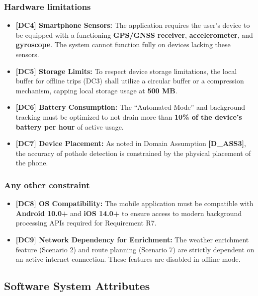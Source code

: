 \subsubsection{Hardware limitations}
\begin{itemize}
    \item \textbf{[DC4] Smartphone Sensors:} The application requires the user's device to be equipped with a functioning \textbf{GPS/GNSS receiver}, \textbf{accelerometer}, and \textbf{gyroscope}. The system cannot function fully on devices lacking these sensors.
    \item \textbf{[DC5] Storage Limits:} To respect device storage limitations, the local buffer for offline trips (DC3) shall utilize a circular buffer or a compression mechanism, capping local storage usage at \textbf{500 MB}.
    \item \textbf{[DC6] Battery Consumption:} The ``Automated Mode'' and background tracking must be optimized to not drain more than \textbf{10\% of the device's battery per hour} of active usage.
    \item \textbf{[DC7] Device Placement:} As noted in Domain Assumption \textbf{[D\_ASS3]}, the accuracy of pothole detection is constrained by the physical placement of the phone.
\end{itemize}

\subsubsection{Any other constraint}
\begin{itemize}
    \item \textbf{[DC8] OS Compatibility:} The mobile application must be compatible with \textbf{Android 10.0+} and \textbf{iOS 14.0+} to ensure access to modern background processing APIs required for Requirement R7.
    \item \textbf{[DC9] Network Dependency for Enrichment:} The weather enrichment feature (Scenario 2) and route planning (Scenario 7) are strictly dependent on an active internet connection. These features are disabled in offline mode.
\end{itemize}
\newpage
\subsection{Software System Attributes}


